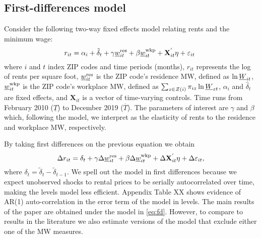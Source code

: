     
\subsection{First-differences model}

Consider the following two-way fixed effects model relating rents and the 
minimum wage:
\begin{equation*} \label{eq:did_lev}
    r_{it} = \alpha_i + \tilde{\delta}_t 
           + \gamma \underline{w}^{\text{res}}_{it} + \beta \underline{w}^{\text{wkp}}_{it}
           + \mathbf{X}^{'}_{it}\eta
           + \varepsilon_{it} \ 
\end{equation*}    
where
$i$ and $t$ index ZIP codes and time periods (months),
$r_{it}$ represents the log of rents per square foot,
$\underline{w}^{\text{res}}_{it}$ is the ZIP code's residence MW, defined as 
$\ln \underline{W}_{it}$,
$\underline{w}^{\text{wkp}}_{it}$ is the ZIP code's workplace MW, defined as 
$\sum_{z\in\mathcal{Z}(i)} \pi_{iz}\ln \underline{W}_{zt}$,
$\alpha_i$ and $\hat{\delta}_t$ are fixed effects, and 
$\mathbf{X}_{it}$ is a vector of time-varying controls.
Time runs from February 2010 ($\underline{T}$) to December 2019 ($\overline{T}$).
The parameters of interest are $\gamma$ and $\beta$ which, following the model, 
we interpret as the elasticity of rents to the residence and workplace MW, 
respectively.

By taking first differences on the previous equation we obtain
\begin{equation}\label{eq:fd}
    \Delta r_{it} = \delta_t
                  + \gamma \Delta \underline{w}^{\text{res}}_{it} + \beta \Delta \underline{w}^{\text{wkp}}_{it}
                  + \Delta \mathbf{X}^{'}_{it}\eta
                  + \Delta \varepsilon_{it} ,
\end{equation}
where $\delta_t = \tilde{\delta}_t - \tilde{\delta}_{t-1}$.
We spell out the model in first differences because we expect unobserved shocks 
to rental prices to be serially autocorrelated over time, making the levels
model less efficient. 
Appendix Table XX shows evidence of AR(1) auto-correlation in the error term of
the model in levels.
The main results of the paper are obtained under the model in \eqref{eq:fd}. 
However, to compare to results in the literature we also estimate versions of 
the model that exclude either one of the MW measures.



